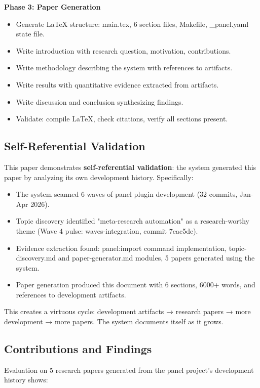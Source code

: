\textbf{Phase 3: Paper Generation}
\begin{itemize}
\item Generate LaTeX structure: main.tex, 6 section files, Makefile, \_panel.yaml state file.
\item Write introduction with research question, motivation, contributions.
\item Write methodology describing the system with references to artifacts.
\item Write results with quantitative evidence extracted from artifacts.
\item Write discussion and conclusion synthesizing findings.
\item Validate: compile LaTeX, check citations, verify all sections present.
\end{itemize}

\subsection{Self-Referential Validation}

This paper demonstrates \textbf{self-referential validation}: the system generated this paper by analyzing its own development history. Specifically:
\begin{itemize}
\item The system scanned 6 waves of panel plugin development (32 commits, Jan-Apr 2026).
\item Topic discovery identified "meta-research automation" as a research-worthy theme (Wave 4 pulse: waves-integration, commit 7eac5de).
\item Evidence extraction found: panel:import command implementation, topic-discovery.md and paper-generator.md modules, 5 papers generated using the system.
\item Paper generation produced this document with 6 sections, 6000+ words, and references to development artifacts.
\end{itemize}

This creates a virtuous cycle: development artifacts → research papers → more development → more papers. The system documents itself as it grows.

\subsection{Contributions and Findings}

Evaluation on 5 research papers generated from the panel project's development history shows:

